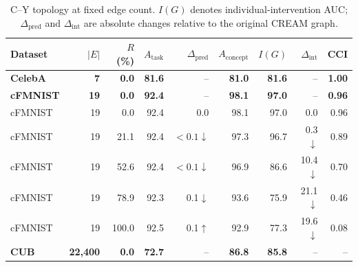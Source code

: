 \begin{table}[t]
\centering
\caption{C--Y topology at fixed edge count. $I(G)$ denotes individual-intervention AUC; $\Delta_{\mathrm{pred}}$ and $\Delta_{\mathrm{int}}$ are absolute changes relative to the original CREAM graph.}
\label{tab:cy_topology}
\small
\setlength{\tabcolsep}{6pt}
\begin{tabular}{lrrrrrrrr}
\toprule
Dataset & $|E|$ & $R$ (\%) & $A_{\mathrm{task}}$ & $\Delta_{\mathrm{pred}}$ & $A_{\mathrm{concept}}$ & $I(G)$ & $\Delta_{\mathrm{int}}$ & CCI \\
\midrule
\rowcolor{gray!15}
\textbf{CelebA} & \textbf{7} & \textbf{0.0} & \textbf{81.6} & -- & \textbf{81.0} & \textbf{81.6} & -- & \textbf{1.00} \\
\midrule
\rowcolor{gray!15}
\textbf{cFMNIST} & \textbf{19} & \textbf{0.0} & \textbf{92.4} & -- & \textbf{98.1} & \textbf{97.0} & -- & \textbf{0.96} \\
cFMNIST & 19 & 0.0 & 92.4 & 0.0 & 98.1 & 97.0 & 0.0 & 0.96 \\
cFMNIST & 19 & 21.1 & 92.4 & $<0.1\downarrow$ & 97.3 & 96.7 & 0.3$\downarrow$ & 0.89 \\
cFMNIST & 19 & 52.6 & 92.4 & $<0.1\downarrow$ & 96.9 & 86.6 & 10.4$\downarrow$ & 0.70 \\
cFMNIST & 19 & 78.9 & 92.3 & 0.1$\downarrow$ & 93.6 & 75.9 & 21.1$\downarrow$ & 0.46 \\
cFMNIST & 19 & 100.0 & 92.5 & 0.1$\uparrow$ & 92.9 & 77.3 & 19.6$\downarrow$ & 0.08 \\
\midrule
\rowcolor{gray!15}
\textbf{CUB} & \textbf{22,400} & \textbf{0.0} & \textbf{72.7} & -- & \textbf{86.8} & \textbf{85.8} & -- & -- \\
\bottomrule
\end{tabular}
\end{table}
